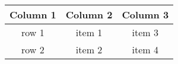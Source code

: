 \begin{table}[]
\begin{tabular}{ccc}
\toprule
 Column 1 & Column 2 &  Column 3  \\
 \midrule
 row 1 & item 1 & item 3 \\
 row 2 & item 2 & item 4\\
 \bottomrule
\end{tabular}
\end{table}